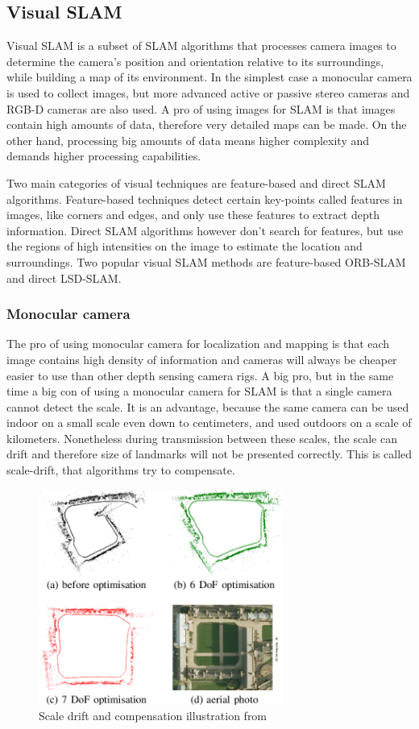 \subsection{Visual SLAM}
Visual SLAM is a subset of SLAM algorithms that processes camera images to determine the camera's position and orientation
relative to its surroundings, while building a map of its environment. In the simplest case a monocular camera is used
to collect images, but more advanced active or passive stereo cameras and RGB-D cameras are also used. A pro of using
images for SLAM is that images contain high amounts of data, therefore very detailed maps can be made. On the other hand,
processing big amounts of data means higher complexity and demands higher processing capabilities.


Two main categories of visual techniques are feature-based and direct SLAM algorithms. Feature-based techniques detect
certain key-points called features in images, like corners and edges, and only use these features to extract depth information.
Direct SLAM algorithms however don't search for features, but use the regions of high intensities on the image to estimate the 
location and surroundings. Two popular visual SLAM methods are feature-based ORB-SLAM and direct LSD-SLAM.

\subsubsection{Monocular camera}
The pro of using monocular camera for localization and mapping is that each image contains high density of information and
cameras will always be cheaper easier to use than other depth sensing camera rigs. 
A big pro, but in the same time a big con of using a monocular camera for SLAM is that a single camera cannot detect the scale.
It is an advantage, because the same camera can be used indoor on a small scale even down to centimeters, and used outdoors on
a scale of kilometers. Nonetheless during transmission between these scales, the scale can drift and therefore size of
landmarks will not be presented correctly. This is called scale-drift, that algorithms try to compensate.

\begin{figure}[!ht]
    \centering
	\includegraphics[width=80mm, keepaspectratio]{figures/scale_drift_lsd_slam.png}
    \caption{Scale drift and compensation illustration from \cite{Strasdat2010ScaleDL}}
    \label{fig:scale_drift_lsd_slam}
\end{figure}


